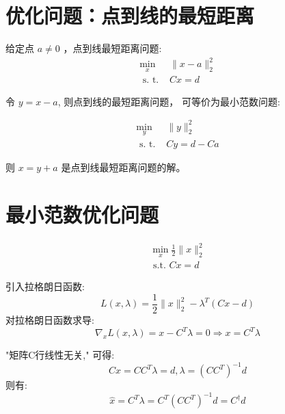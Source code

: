 \section{优化问题：点到线的最短距离}

\begin{problem}
    给定点 $ a \neq 0 $ ，点到线最短距离问题:
$$
\begin{array}{ll}
\min _{x} & \|x-a\|_{2}^{2} \\
\text { s. t. } & C x=d
\end{array}
$$

\end{problem}

令 $ y=x-a $, 则点到线的最短距离问题， 可等价为最小范数问题:

\begin{problem}
    $$
\begin{array}{ll}
\min _{y} & \|y\|_{2}^{2} \\
\text { s. t. } & C y=d-C a
\end{array}
$$
\end{problem}

则 $ x=y+a $ 是点到线最短距离问题的解。

\section{最小范数优化问题}

\begin{problem}
    $$
\begin{array}{l}
\min _{x} \frac{1}{2}\|x\|_{2}^{2} \\
\text { s.t. } C x=d
\end{array}
$$
\end{problem}

引入拉格朗日函数:
$$
L(x, \lambda)=\frac{1}{2}\|x\|_{2}^{2}-\lambda^{T}(C x-d)
$$
对拉格朗日函数求导:
$$
\nabla_{x} L(x, \lambda)=x-C^{T} \lambda=0 \Rightarrow x=C^{T} \lambda
$$

"矩阵C行线性无关," 可得:
$$
C x=C C^{T} \lambda=d, \lambda=\left(C C^{T}\right)^{-1} d
$$
则有:
$$
\hat{x}=C^{T} \lambda=C^{T}\left(C C^{T}\right)^{-1} d=C^{\dagger} d
$$

